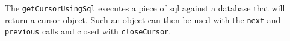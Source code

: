 The \verb+getCursorUsingSql+ executes a piece of sql against a database that will return a cursor object. Such an
object can then be used with the \verb+next+ and \verb+previous+ calls and closed with \verb+closeCursor+.
